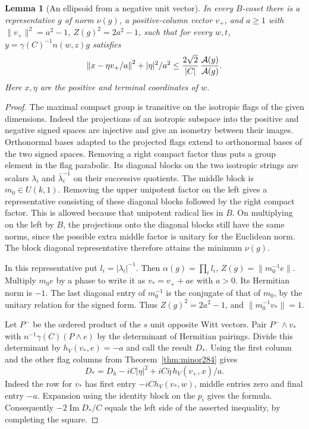 \documentclass[a4paper,11pt]{article}
\newtheorem{lemma}[proposition]{Lemma}
\theoremstyle{definition}
\theoremstyle{remark}
\numberwithin{equation}{section}
\begin{document}
\begin{lemma}[An ellipsoid from a negative unit vector]\leavevmode
\label{lem:negative285}
In every \(B\)-coset there is a representative \(g\) of
norm \(\nu(g)\), a positive-column vector \(v_+\), and
\(a\ge1\) with \(\|v_+\|^2=a^2-1\), \(Z(g)^2=2a^2-1\),
such that for every \(w,t\), \(y=\gamma(C)^{-1}n(w,z)g\)
satisfies
\[
 \left\|x-\eta v_+/a\right\|^2+|\eta|^2/a^2
       \le \frac{2\sqrt2}{|C|}\,
                            \frac{{\cal A}(y)}{{\cal A}(g)} .
\]
Here \(x,\eta\) are the positive and terminal coordinates of \(w\).
\end{lemma}
\begin{proof}
The maximal compact group is transitive on the isotropic
flags of the given dimensions. Indeed the projections of
an isotropic subspace into the positive and negative signed
spaces are injective and give an isometry between their
images. Orthonormal bases adapted to the projected flags
extend to orthonormal bases of the two signed spaces.
Removing a right compact factor thus puts a group element
in the flag parabolic. Its diagonal blocks on the two
isotropic strings are scalars \(\lambda_i\) and
\(\bar\lambda_i^{-1}\) on their successive quotients.
The middle block is \(m_0\in U(k,1)\). Removing the
upper unipotent factor on the left gives a representative
consisting of these diagonal blocks followed by the right
compact factor. This is allowed because that unipotent
radical lies in \(B\). On multiplying on the left by \(B\),
the projections onto the diagonal blocks still have the
same norms, since the possible extra middle factor is
unitary for the Euclidean norm. The block diagonal
representative therefore attains the minimum \(\nu(g)\).

In this representative put \(l_i=|\lambda_i|^{-1}\).
Then \(\alpha(g)=\prod_i l_i\), \(Z(g)=\|m_0^{-1}e\|\).
Multiply \(m_0e\) by a phase to write it as \(v_*=v_++ae\)
with \(a>0\). Its Hermitian norm is \(-1\).
The last diagonal entry of \(m_0^{-1}\) is the conjugate
of that of \(m_0\), by the unitary relation for the signed
form. Thus \(Z(g)^2=2a^2-1\), and \(\|m_0^{-1}v_*\|=1\).

Let \(P^-\) be the ordered product of the \(s\) unit opposite
Witt vectors. Pair \(P^-\wedge v_*\) with
\(n^{-1}\gamma(C)(P\wedge e)\) by the determinant of
Hermitian pairings. Divide this determinant by
\(h_V(v_*,e)=-a\) and call the result \(D_*\).
Using the first column and the other flag columns from
Theorem~\ref{thm:minor284} gives
\[
 D_*=D_h-iC|\eta|^2+iC\bar\eta\,h_V(v_+,x)/a .
\]
Indeed the row for \(v_*\) has first entry
\(-iC h_V(v_*,w)\), middle entries zero and final entry \(-a\).
Expansion using the identity block on the \(p_i\) gives the formula.
Consequently \(-2\operatorname{Im}D_*/C\) equals the
left side of the asserted inequality, by completing the square.


\end{proof}
\end{document}
